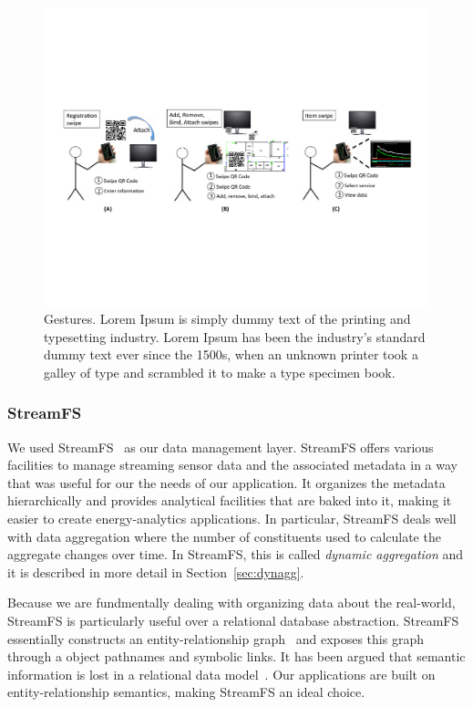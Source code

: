\begin{figure}[htb!]
\begin{center}
\includegraphics[width=\textwidth]{figs/swipes}
\caption{Gestures. Lorem Ipsum is simply dummy text of the printing and typesetting industry. Lorem Ipsum has 
been the industry's standard dummy text ever since the 1500s, when an unknown printer took a galley of 
type and scrambled it to make a type specimen book.  }
\label{fig:gestures}
\end{center}
\end{figure}

\subsubsection{StreamFS}
\label{sec:streamfs}
We used StreamFS~\cite{streamfs} as our data management layer.  StreamFS offers various
facilities to manage streaming sensor data and the associated metadata in a way that was useful for our the needs
of our application.  It organizes the metadata hierarchically and provides analytical
facilities that are baked into it, making it easier to create energy-analytics applications.  In particular,
StreamFS deals well with data aggregation where the number of constituents used to calculate the aggregate
changes over time.  In StreamFS, this is called \emph{dynamic aggregation} and it is described in more detail
in Section~\ref{sec:dynagg}.

Because we are fundmentally dealing with organizing data about the real-world, StreamFS is particularly useful over
a relational database abstraction.  StreamFS essentially constructs an entity-relationship graph~\cite{Chen76theentity-relationship}
and exposes this graph through a object pathnames and symbolic links.  It has been argued that semantic information
is lost in a relational data model~\cite{semanticmodel,semanticrelational}.  Our applications are built on
entity-relationship semantics, making StreamFS an ideal choice.

